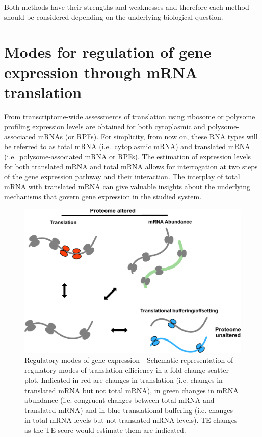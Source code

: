 \documentclass[
  12pt,
  openany]{book}
\begin{document}
Both methods have their strengths and weaknesses and therefore each method should be considered depending on the underlying biological question.
\newline

\section{Modes for regulation of gene expression through mRNA translation} \label{modes}

From transcriptome-wide assessments of translation using ribosome or polysome profiling expression levels are obtained for both cytoplasmic and polysome-associated mRNAs (or RPFs). For simplicity, from now on, these RNA types will be referred to as total mRNA (i.e.~cytoplasmic mRNA) and translated mRNA (i.e.~polysome-associated mRNA or RPFs). The estimation of expression levels for both translated mRNA and total mRNA allows for interrogation at two steps of the gene expression pathway and their interaction. The interplay of total mRNA with translated mRNA can give valuable insights about the underlying mechanisms that govern gene expression in the studied system.

\begin{figure}
  \includegraphics{./figures/geneModes_MRNA.pdf}
  \caption{Regulatory modes of gene expression - Schematic representation of regulatory modes of translation efficiency in a fold-change scatter plot. Indicated in red are changes in translation (i.e. changes in translated mRNA but not total mRNA), in green changes in mRNA abundance (i.e. congruent changes between total mRNA and translated mRNA) and in blue translational buffering (i.e. changes in total mRNA levels but not translated mRNA levels). TE changes as the TE-score would estimate them are indicated.\label{fig:modes}}
\end{figure}
\end{document}
